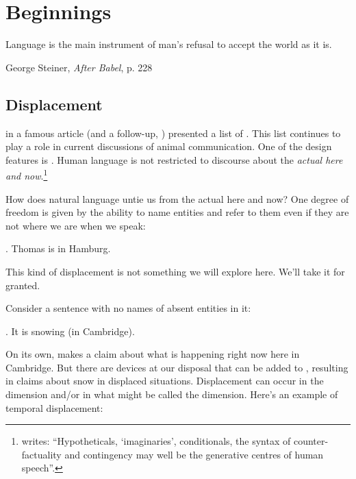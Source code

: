 \chapter{Beginnings}\label{cha:beginnings_of_intensional_semantics} %

\epigraph{Language is the main instrument of man's refusal to accept the world
  as it is.}{George Steiner, \emph{After Babel}, p. 228}


\minitoc

\section{Displacement} \label{sec:displacement}

\citet{hockett:origin:60} in a famous
article (and a follow-up, \citet{hockett:design:68}) presented a list of
. This list continues to play a role in
current discussions of animal communication. One of the design features is
. Human language is not restricted to discourse about the
\emph{actual here and now}.\footnote{\citet[226]{steiner:1998:babel} writes:
  ``Hypotheticals, `imaginaries', conditionals, the syntax of counter-factuality
  and contingency may well be the generative centres of human speech''.}

How does natural language untie us from the actual here and now? One degree of
freedom is given by the ability to name entities and refer to them even if they
are not where we are when we speak:

\ex. Thomas is in Hamburg.

This kind of displacement is not something we will explore here. We'll take it
for granted.

Consider a sentence with no names of absent entities in it:

\ex. It is snowing (in Cambridge).

On its own, \Last makes a claim about what is happening right now here in
Cambridge. But there are devices at our disposal that can be added to \Last,
resulting in claims about snow in displaced situations. Displacement can occur
in the  dimension and/or in what might be called the
 dimension. Here's an
example of temporal displacement:

